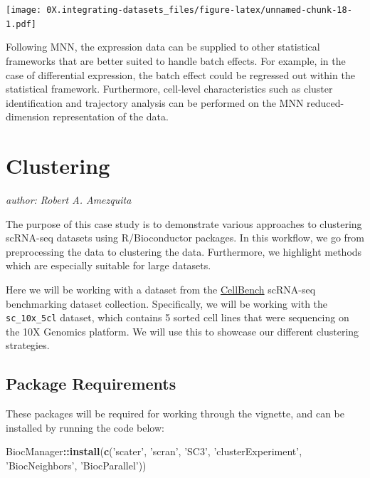 \documentclass[]{book}
\newenvironment{Shaded}{\begin{snugshade}}{\end{snugshade}}
\newcommand{\KeywordTok}[1]{\textcolor[rgb]{0.13,0.29,0.53}{\textbf{#1}}}
\newcommand{\NormalTok}[1]{#1}
\newcommand{\OperatorTok}[1]{\textcolor[rgb]{0.81,0.36,0.00}{\textbf{#1}}}
\newcommand{\StringTok}[1]{\textcolor[rgb]{0.31,0.60,0.02}{#1}}
\begin{document}
\texttt{[image: 0X.integrating-datasets\_files/figure-latex/unnamed-chunk-18-1.pdf]}

Following MNN, the expression data can be supplied to other statistical frameworks that are better suited to handle batch effects. For example, in the case of differential expression, the batch effect could be regressed out within the statistical framework. Furthermore, cell-level characteristics such as cluster identification and trajectory analysis can be performed on the MNN reduced-dimension representation of the data.

\hypertarget{clustering}{%
\chapter{Clustering}\label{clustering}}

\emph{author: Robert A. Amezquita}

The purpose of this case study is to demonstrate various approaches to clustering scRNA-seq datasets using R/Bioconductor packages. In this workflow, we go from preprocessing the data to clustering the data. Furthermore, we highlight methods which are especially suitable for large datasets.

Here we will be working with a dataset from the \href{https://github.com/LuyiTian/CellBench_data}{CellBench} scRNA-seq benchmarking dataset collection. Specifically, we will be working with the \texttt{sc\_10x\_5cl} dataset, which contains 5 sorted cell lines that were sequencing on the 10X Genomics platform. We will use this to showcase our different clustering strategies.

\hypertarget{package-requirements-2}{%
\section{Package Requirements}\label{package-requirements-2}}

These packages will be required for working through the vignette, and can be installed by running the code below:

\begin{Shaded}
\begin{Highlighting}[]
\NormalTok{BiocManager}\OperatorTok{::}\KeywordTok{install}\NormalTok{(}\KeywordTok{c}\NormalTok{(}\StringTok{'scater'}\NormalTok{, }\StringTok{'scran'}\NormalTok{,}
                      \StringTok{'SC3'}\NormalTok{, }\StringTok{'clusterExperiment'}\NormalTok{, }\StringTok{'BiocNeighbors'}\NormalTok{,}
                      \StringTok{'BiocParallel'}\NormalTok{))}
\end{Highlighting}
\end{Shaded}
\end{document}
